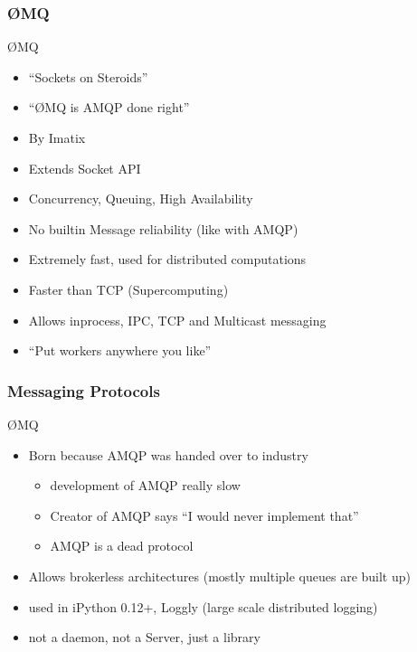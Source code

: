 \documentclass[serif,mathserif]{beamer}
\begin{document}
\begin{frame}
\frametitle{\O MQ}
\O MQ
\begin{itemize}
  \item ``Sockets on Steroids''
  \item ``\O MQ is AMQP done right''
  \item By Imatix
  \item Extends Socket API
  \item Concurrency, Queuing, High Availability
  \item No builtin Message reliability (like with AMQP)
  \item Extremely fast, used for distributed computations
  \item Faster than TCP (Supercomputing)
  \item Allows inprocess, IPC, TCP and Multicast messaging
  \item ``Put workers anywhere you like''
\end{itemize}
\end{frame}



\begin{frame}
\frametitle{Messaging Protocols}
\O MQ
\begin{itemize}
  \item Born because AMQP was handed over to industry
  \begin{itemize}
    \item development of AMQP really slow
    \item Creator of AMQP says ``I would never implement that'' %
    \item AMQP is a dead protocol
  \end{itemize}
  \item Allows brokerless architectures (mostly multiple queues are built up)
  \item used in iPython 0.12+, Loggly (large scale distributed logging)
  \item not a daemon, not a Server, just a library
\end{itemize}
\end{frame}
\end{document}
